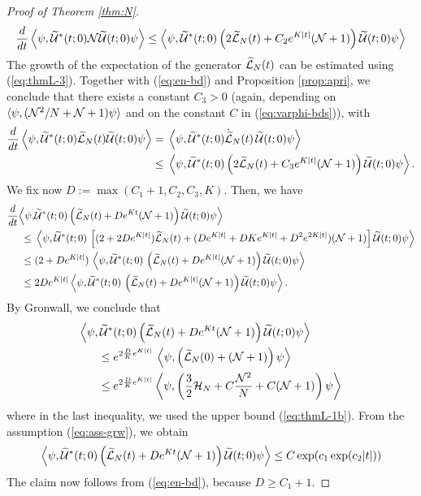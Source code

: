 \documentclass[11pt,a4paper]{article}
\newcommand{\cU}{{\cal U}}
\newcommand{\wt}{\widetilde}
\newcommand{\cH}{{\cal H}}
\newcommand{\cL}{{\cal L}}
\newcommand{\cN}{{\cal N}}
\begin{document}
\begin{proof}[Proof of Theorem \ref{thm:N}]
\[\begin{split}
\frac{d}{dt} \left\langle \psi, \wt{\cU}^* (t;0) \cN \wt{\cU} (t;0) \psi \right\rangle  \leq  \left\langle \psi , \wt{\cU}^* (t;0)  \left(2 \wt{\cL}_N (t) +C_2 e^{K|t|} (\cN + 1) \right)  \wt{\cU} (t;0) \psi \right\rangle
\end{split} \]
The growth of the expectation of the generator $\wt{\cL}_N (t)$ can be estimated using (\ref{eq:thmL-3}). Together with (\ref{eq:en-bd}) and Proposition \ref{prop:apri}, we conclude that there exists a constant $C_3 >0$ (again, depending on $\langle \psi , (\cN^2/ N + \cN + 1) \psi \rangle$ and on the constant $C$ in (\ref{eq:varphi-bds})), with 
\[ \begin{split}
\frac{d}{dt} \left\langle \psi, \wt{\cU}^* (t;0) \wt{\cL}_N (t) \wt{\cU} (t;0) \psi \right\rangle = \; & \left\langle \psi, \wt{\cU}^* (t;0) \dot{\wt{\cL}}_N (t) \, \wt{\cU} (t;0) \psi \right\rangle \\ \leq \; & \left\langle \psi , \wt{\cU}^* (t;0) \left( 2 \wt{\cL}_N (t) + C_3 e^{K|t|} (\cN + 1) \right) \wt{\cU} (t;0) \psi \right\rangle. 
\end{split} \]
We fix now $D := \max (C_1 + 1, C_2 , C_3 , K)$. Then, we have
\[ \begin{split} 
\frac{d}{dt} \Big\langle \psi , &\wt{\cU}^* (t;0) \left( \wt{\cL}_N (t) + D e^{K t} (\cN + 1) \right) \wt{\cU} (t;0) \psi \Big\rangle \\  \leq \; & \left\langle \psi, \wt{\cU}^* (t;0) \, \left[ (2 + 2D e^{K|t|}) \wt{\cL}_N (t) + (D e^{K |t|} +D K e^{K |t|} + D^2 e^{2K |t|}) (\cN + 1) \right] \wt{\cU} (t;0) \psi \right\rangle\\  \leq \; &(2 + D e^{K|t|}) \, \left\langle \psi, \wt{\cU}^* (t;0) \, \left( \wt{\cL}_N (t) + D e^{K|t|} (\cN + 1) \right) \wt{\cU} (t;0) \psi \right \rangle \\ \leq \; & 2D e^{K |t|} \left\langle \psi, \wt{\cU}^* (t;0) \, \left( \wt{\cL}_N (t) + D e^{K|t|} (\cN + 1) \right) \wt{\cU} (t;0) \psi \right\rangle. \end{split} \]
By Gronwall, we conclude that
\[ \begin{split}  \Big\langle \psi , \wt{\cU}^* &(t;0) \left( \wt{\cL}_N (t) + 
D e^{K t} (\cN + 1) \right) \wt{\cU} (t;0) \psi \Big\rangle \\ \leq \; & e^{2 \frac{D}{K} e^{K |t|}} \, \left\langle \psi , \left( \wt{\cL}_N (0) + (\cN + 1)\right) \psi \right\rangle \\ \leq \; &  e^{2 \frac{D}{K} e^{K |t|}} \left\langle \psi , \left( \frac{3}{2} \cH_N+ C \frac{\cN^2}{N} + C (\cN+ 1) \right) \psi \right\rangle \end{split} \]
where in the last inequality, we used the upper bound (\ref{eq:thmL-1b}). {F}rom the assumption (\ref{eq:ass-grw}), we obtain 
\[  \Big\langle \psi , \wt{\cU}^* (t;0) \left( \wt{\cL}_N (t) + 
D e^{K t} (\cN + 1) \right) \wt{\cU} (t;0) \psi \Big\rangle  \leq C \exp (c_1 \exp (c_2 |t|)) \]
The claim now follows from (\ref{eq:en-bd}), because $D \geq C_1 +1$.
\end{proof}
\end{document}
